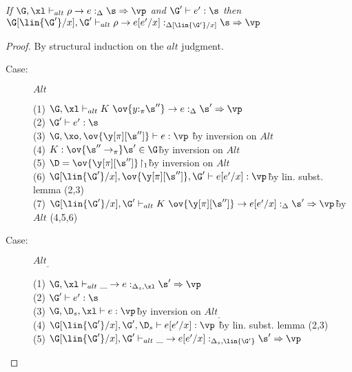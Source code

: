 \begin{sublemma}
\emph{If $\G, \xl \vdash_{alt} \rho \to e :_\Delta \s \Rightarrow \vp$ and $\G'
    \vdash e' : \s$ then $\G[\lin{\G'}/x],\G' \vdash_{alt} \rho \to e[e'/x] :_{\Delta[\lin{\G'}/x]} \s
    \Rightarrow \vp$}
\end{sublemma}

\begin{proof}
By structural induction on the $alt$ judgment.

\begin{description}
\item[Case:] $Alt$
\begin{tabbing}
    (1) $\G, \xl \vdash_{alt} K~\ov{y{:}_\pi\s''} \to e :_\Delta \s' \Rightarrow \vp$\\
    (2) $\G' \vdash e' : \s$\\
    (3) $\G, \xo, \ov{\y[\pi][\s'']} \vdash e : \vp$ \` by inversion on $Alt$\\
    (4) $K : \ov{\s'' \to_\pi} \s' \in \G$\` by inversion on $Alt$\\
    (5) $\D = \ov{\y[\pi][\s'']}\!\upharpoonright_1$\` by inversion on $Alt$\\
    (6) $\G[\lin{\G'}/x],\ov{\y[\pi][\s'']},\G' \vdash e[e'/x] : \vp$\` by lin. subst. lemma (2,3)\\
    (7) $\G[\lin{\G'}/x], \G' \vdash_{alt} K~\ov{\y[\pi][\s'']} \to e[e'/x] :_\Delta \s' \Rightarrow \vp$\` by $Alt$ (4,5,6)\\
\end{tabbing}

\item[Case:] $Alt_\_$
\begin{tabbing}
    (1) $\G, \xl \vdash_{alt} \_ \to e :_{\Delta_s,\xl}\s' \Rightarrow \vp$\\
    (2) $\G' \vdash e' : \s$\\
    (3) $\G, \D_s, \xl \vdash e : \vp$\` by inversion on $Alt_\_$\\
    (4) $\G[\lin{\G'}/x],\G',\D_s \vdash e[e'/x] : \vp$ \` by lin. subst. lemma (2,3)\\
    (5) $\G[\lin{\G'}/x],\G' \vdash_{alt} \_ \to e[e'/x] :_{\Delta_s,\lin{\G'}} \s' \Rightarrow \vp$\\
\end{tabbing}

\end{description}

\end{proof}

